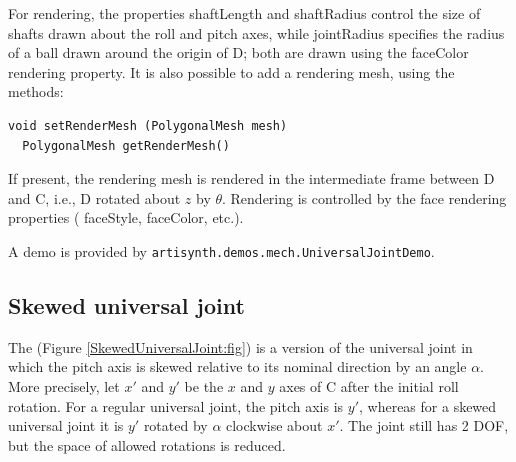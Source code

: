 For rendering, the properties {\sf shaftLength} and {\sf shaftRadius} control
the size of shafts drawn about the roll and pitch axes, while {\sf jointRadius}
specifies the radius of a ball drawn around the origin of D; both are drawn
using the {\sf faceColor} rendering property. It is also
possible to add a rendering mesh, using the methods:
\begin{lstlisting}[]
  void setRenderMesh (PolygonalMesh mesh)
  PolygonalMesh getRenderMesh()
\end{lstlisting}
%
If present, the rendering mesh is rendered in the intermediate
frame between D and C, i.e., D rotated about $z$ by $\theta$.
Rendering is controlled by the face rendering properties (
{\sf faceStyle}, {\sf faceColor}, etc.).

A demo is provided by {\tt artisynth.demos.mech.UniversalJointDemo}.

\subsection{Skewed universal joint}

The 
(Figure \ref{SkewedUniversalJoint:fig}) is a version of the universal
joint in which the pitch axis is skewed relative to its nominal direction
by an angle $\alpha$. More precisely, let $x'$ and $y'$ be the $x$ and
$y$ axes of C after the initial roll rotation. For a regular universal
joint, the pitch axis is $y'$, whereas for a skewed universal joint it
is $y'$ rotated by $\alpha$ clockwise about $x'$. The joint still has
2 DOF, but the space of allowed rotations is reduced.

